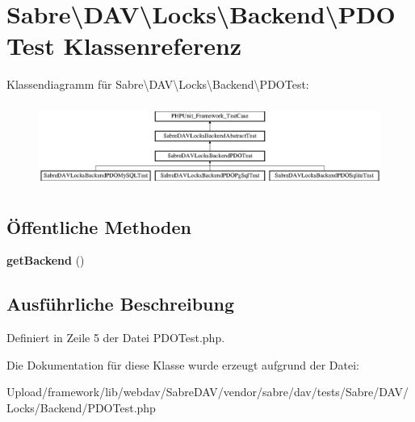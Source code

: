 \hypertarget{class_sabre_1_1_d_a_v_1_1_locks_1_1_backend_1_1_p_d_o_test}{}\section{Sabre\textbackslash{}D\+AV\textbackslash{}Locks\textbackslash{}Backend\textbackslash{}P\+D\+O\+Test Klassenreferenz}
\label{class_sabre_1_1_d_a_v_1_1_locks_1_1_backend_1_1_p_d_o_test}
Klassendiagramm für Sabre\textbackslash{}D\+AV\textbackslash{}Locks\textbackslash{}Backend\textbackslash{}P\+D\+O\+Test\+:\begin{figure}[H]
\begin{center}
\leavevmode
\includegraphics[height=2.745098cm]{class_sabre_1_1_d_a_v_1_1_locks_1_1_backend_1_1_p_d_o_test}
\end{center}
\end{figure}
\subsection*{Öffentliche Methoden}
\begin{DoxyCompactItemize}
\item 
\mbox{\label{class_sabre_1_1_d_a_v_1_1_locks_1_1_backend_1_1_p_d_o_test_ae1588e434bbe4edc809d5f14ef9487c7}} 
{\bfseries get\+Backend} ()
\end{DoxyCompactItemize}


\subsection{Ausführliche Beschreibung}


Definiert in Zeile 5 der Datei P\+D\+O\+Test.\+php.



Die Dokumentation für diese Klasse wurde erzeugt aufgrund der Datei\+:\begin{DoxyCompactItemize}
\item 
Upload/framework/lib/webdav/\+Sabre\+D\+A\+V/vendor/sabre/dav/tests/\+Sabre/\+D\+A\+V/\+Locks/\+Backend/P\+D\+O\+Test.\+php\end{DoxyCompactItemize}
